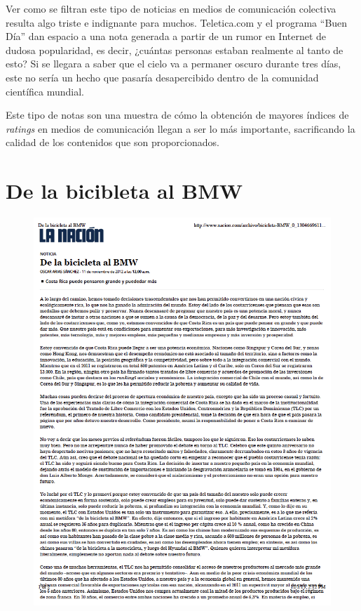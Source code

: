 \documentclass[times]{simauth}
\begin{document}
Ver como se filtran este tipo de noticias en medios de comunicación colectiva resulta algo triste e indignante para muchos. Teletica.com y el programa ``Buen Día'' dan espacio a una nota generada a partir de un rumor en Internet de dudosa popularidad, es decir, ¿cuántas personas estaban realmente al tanto de esto? Si se llegara a saber que el cielo va a permaner oscuro durante tres días, este no sería un hecho que pasaría desapercibido dentro de la comunidad científica mundial.

Este tipo de notas son una muestra de cómo la obtención de mayores índices de \textit{ratings} en medios de comunicación llegan a ser lo más importante, sacrificando la calidad de los contenidos que son proporcionados.

\newpage
\section{De la bicibleta al BMW}
\begin{figure}[h!]
    \centering
    \includegraphics[width=16.5cm]{oscar-arias-bmw-1}
    \label{fig:falacia9-1}
\end{figure}
\end{document}
